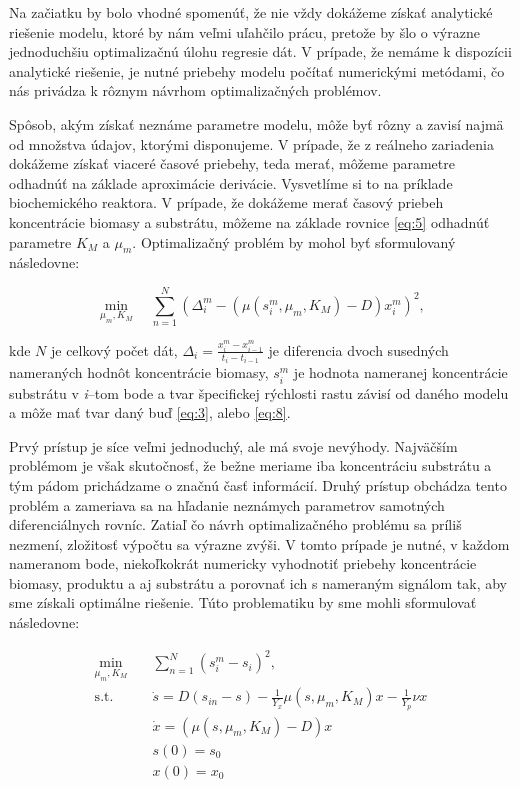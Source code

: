 Na začiatku by bolo vhodné spomenúť, že nie vždy dokážeme získať analytické riešenie modelu, ktoré by nám veľmi uľahčilo prácu, pretože by šlo o výrazne jednoduchšiu optimalizačnú úlohu regresie dát. V prípade, že nemáme k dispozícii analytické riešenie, je nutné priebehy modelu počítať numerickými metódami, čo nás privádza k rôznym návrhom optimalizačných problémov. 

Spôsob, akým získať neznáme parametre modelu, môže byť rôzny a zavisí najmä od množstva údajov, ktorými disponujeme. V prípade, že z reálneho zariadenia dokážeme získať viaceré časové priebehy, teda merať, môžeme parametre odhadnúť na základe aproximácie derivácie. Vysvetlíme si to na príklade biochemického reaktora. V prípade, že dokážeme merať časový priebeh koncentrácie biomasy a substrátu, môžeme na základe rovnice \eqref{eq:5} odhadnúť parametre $K_{M}$ a $\mu_{m}$. Optimalizačný problém by mohol byť sformulovaný následovne:

\begin{equation}
	\min_{\mu_{m},K_{M}} \quad \sum_{n=1}^{N} \left(\Delta_{i}^m-\left(\mu(s_i^m,\mu_{m},K_M)-D\right)x_i^m\right)^2,  
\end{equation}

\noindent kde $ N $ je celkový počet dát, $ \Delta_{i} = \frac{x_{i}^m-x_{i-1}^m}{t_i-t_{i-1}} $ je diferencia dvoch susedných nameraných hodnôt koncentrácie biomasy, $ s_i^m $ je hodnota nameranej koncentrácie substrátu v \textit{i}--tom bode a tvar špecifickej rýchlosti rastu závisí od daného modelu a môže mať tvar daný buď \eqref{eq:3}, alebo \eqref{eq:8}.

Prvý prístup je síce veľmi jednoduchý, ale má svoje nevýhody. Najväčším problémom je však skutočnosť, že bežne meriame iba koncentráciu substrátu a tým pádom prichádzame o značnú časť informácií. Druhý prístup obchádza tento problém a zameriava sa na hľadanie neznámych parametrov samotných diferenciálnych rovníc. Zatiaľ čo návrh optimalizačného problému sa príliš nezmení, zložitosť výpočtu sa výrazne zvýši. V tomto prípade je nutné, v každom nameranom bode, niekoľkokrát numericky vyhodnotiť priebehy koncentrácie biomasy, produktu a aj substrátu a porovnať ich s nameraným signálom  tak, aby sme získali optimálne riešenie. Túto problematiku by sme mohli sformulovať následovne: 

\begin{equation}
	\begin{aligned}
		\min_{\mu_{m},K_{M}} \quad & \sum_{n=1}^{N} \left(s_{i}^m-s_{i}\right)^2, \\
		\textrm{s.t.} \quad & \dot{s} = D(s_{in}-s)-\frac{1}{Y_x}\mu(s,\mu_{m},K_M)x-\frac{1}{Y_p}\nu x \\
							& \dot{x} = (\mu(s,\mu_{m},K_M)-D)x \\
							& s(0) = s_0 \\
							& x(0) = x_0
	\end{aligned}
\end{equation}

